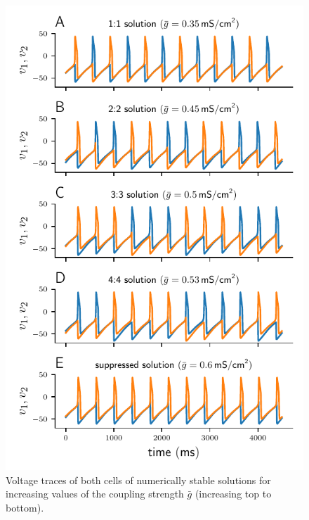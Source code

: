 \documentclass[utf8]{frontiersFPHY} %
\newcommand{\gbar}{\bar g}
\begin{document}
\begin{figure}[h!]
  \centering
  \includegraphics{burst-sols}
  \caption{Voltage traces of both cells of numerically stable solutions for increasing
    values of the coupling strength $\gbar$ (increasing top to
    bottom).~\label{fig:burst-sols}}
\end{figure}
\end{document}
